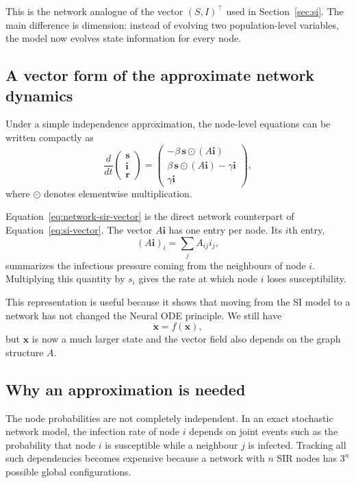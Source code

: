 \documentclass[11pt,a4paper]{article}
\begin{document}
This is the network analogue of the vector
$(S,I)^\top$ used in Section~\ref{sec:si}. The main difference is dimension:
instead of evolving two population-level variables, the model now evolves
state information for every node.


\subsection{A vector form of the approximate network dynamics}

Under a simple independence approximation, the node-level equations can be
written compactly as
\begin{equation}
    \frac{d}{dt}
    \begin{pmatrix}
        \mathbf{s}\\
        \mathbf{i}\\
        \mathbf{r}
    \end{pmatrix}
    =
    \begin{pmatrix}
        -\beta\,\mathbf{s}\odot(A\mathbf{i})\\[3pt]
         \beta\,\mathbf{s}\odot(A\mathbf{i})-\gamma\mathbf{i}\\[3pt]
         \gamma\mathbf{i}
    \end{pmatrix},
    \label{eq:network-sir-vector}
\end{equation}
where $\odot$ denotes elementwise multiplication.

Equation~\eqref{eq:network-sir-vector} is the direct network counterpart of
Equation~\eqref{eq:si-vector}. The vector $A\mathbf{i}$ has one entry per node.
Its $i$th entry,
\[
    (A\mathbf{i})_i=\sum_j A_{ij}i_j,
\]
summarizes the infectious pressure coming from the neighbours of node $i$.
Multiplying this quantity by $s_i$ gives the rate at which node $i$ loses
susceptibility.

This representation is useful because it shows that moving from the SI model
to a network has not changed the Neural ODE principle. We still have
\[
    \dot{\mathbf{x}}=f(\mathbf{x}),
\]
but $\mathbf{x}$ is now a much larger state and the vector field also depends
on the graph structure $A$.


\subsection{Why an approximation is needed}

The node probabilities are not completely independent. In an exact stochastic
network model, the infection rate of node $i$ depends on joint events such as
the probability that node $i$ is susceptible while a neighbour $j$ is
infected. Tracking all such dependencies becomes expensive because a network
with $n$ SIR nodes has $3^n$ possible global configurations.
\end{document}
